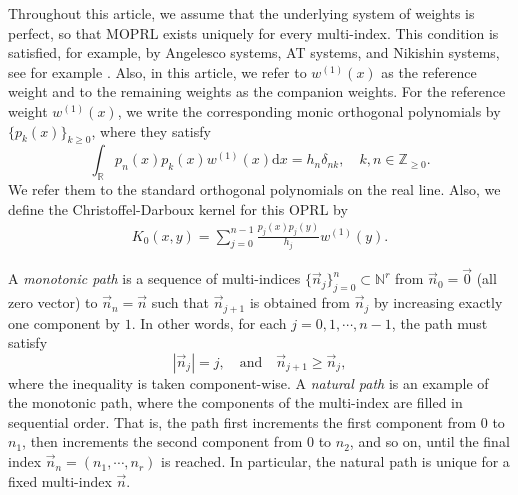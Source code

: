 \documentclass[a4paper,10pt,leqno]{amsart}
\numberwithin{equation}{section}
\theoremstyle{remark}
\newcommand{\dd}{\mathrm{d}}
\newcommand{\R}{\mathbb{R}}
\newcommand{\Z}{\mathbb{Z}}
\newcommand{\N}{\mathbb{N}}
\begin{document}
Throughout this article, we assume that the underlying system of weights is perfect, so that MOPRL exists uniquely for every multi-index. This condition is satisfied, for example, by Angelesco systems, AT systems, and Nikishin systems, see for example \cite{VA20}. Also, in this article, we refer to \(w^{(1)}(x)\) as the reference weight and to the remaining weights as the companion weights.
For the reference weight $w^{(1)}(x)$, we write the corresponding monic orthogonal polynomials by $\{p_k(x)\}_{k \geq 0}$, where they satisfy
\begin{equation}\label{orthogonality w1}
	\int_\R p_n(x)p_k(x) w^{(1)}(x) \dd x = h_n \delta_{nk}, \quad k,n \in \Z_{\geq 0}.
\end{equation}
We refer them to the standard orthogonal polynomials on the real line.
Also, we define the Christoffel-Darboux kernel for this OPRL by
\begin{align} \label{defn of CD kernel for p}
K_0(x,y)=\sum_{j=0}^{n-1}\frac{p_j(x)p_j(y)}{h_j}w^{(1)}(y).
\end{align}



A \textit{monotonic path} is a sequence of multi-indices $\{\vec{n}_j\}_{j=0}^n \subset \N^r$ from $\vec{n}_0 = \vec{0}$ (all zero vector) to $\vec{n}_n = \vec{n}$ such that $\vec{n}_{j+1}$ is obtained from $\vec{n}_j$ by increasing exactly one component by $1$. 
In other words, for each $j=0, 1, \cdots, n-1$, the path must satisfy
\begin{equation}
	|\vec{n}_j| = j, \quad \text{and} \quad \vec{n}_{j+1} \geq \vec{n}_j,
\end{equation}
where the inequality is taken component-wise. 
A \textit{natural path} is an example of the monotonic path, where the components of the multi-index are filled in sequential order. 
That is, the path first increments the first component from $0$ to $n_1$, then increments the second component from $0$ to $n_2$, and so on, until the final index $\vec{n}_n = (n_1, \cdots, n_r)$ is reached. In particular, the natural path is unique for a fixed multi-index $\vec{n}$.
\end{document}
